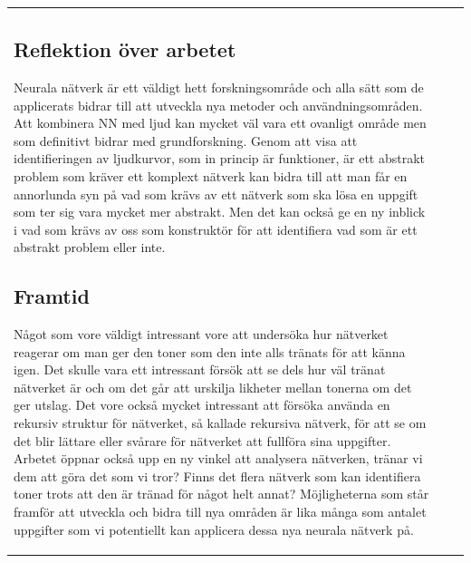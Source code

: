 \documentclass[a4paper,10pt]{article}
\begin{document}
{\begin{tabular}{ |l | l | l| }
\begin{centering}
\begin{centering}
\subsection{Reflektion över arbetet}


Neurala nätverk är ett väldigt hett forskningsområde och alla sätt som de applicerats bidrar till att utveckla nya metoder och användningsområden. Att kombinera NN med ljud kan mycket väl vara ett ovanligt område men som definitivt bidrar med grundforskning. Genom att visa att identifieringen av ljudkurvor, som in princip är funktioner, är ett abstrakt problem som kräver ett komplext nätverk kan bidra till att man får en annorlunda syn på vad som krävs av ett nätverk som ska lösa en uppgift som ter sig vara mycket mer abstrakt. Men det kan också ge en ny inblick i vad som krävs av oss som konstruktör för att identifiera vad som är ett abstrakt problem eller inte.



\subsection{Framtid}

Något som vore väldigt intressant vore att undersöka hur nätverket reagerar om man ger den toner som den inte alls tränats för att känna igen. Det skulle vara ett intressant försök att se dels hur väl tränat nätverket är och om det går att urskilja likheter mellan tonerna om det ger utslag. Det vore också mycket intressant att försöka använda en rekursiv struktur för nätverket, så kallade rekursiva nätverk, för att se om det blir lättare eller svårare för nätverket att fullföra sina uppgifter. Arbetet öppnar också upp en ny vinkel att analysera nätverken, tränar vi dem att göra det som vi tror? Finns det flera nätverk som kan identifiera toner trots att den är tränad för något helt annat? Möjligheterna som står framför att utveckla och bidra till nya områden är lika många som antalet uppgifter som vi potentiellt kan applicera dessa nya neurala nätverk på.


\end{centering}
\end{centering}
\end{tabular}}
\end{document}
